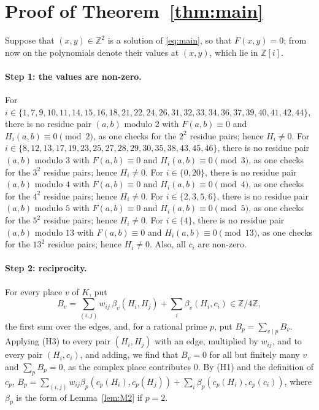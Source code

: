 \documentclass[11pt]{article}
\newcommand{\Z}{\mathbb{Z}}
\begin{document}
\section{Proof of Theorem~\ref{thm:main}}

Suppose that $(x,y)\in\Z^2$ is a solution of \eqref{eq:main}, so that $F(x,y)=0$; from now on the polynomials denote their values at $(x,y)$, which lie in $\Z[i]$.
\paragraph{Step 1: the values are non-zero.} For $i\in\{1,\allowbreak 7,\allowbreak 9,\allowbreak 10,\allowbreak 11,\allowbreak 14,\allowbreak 15,\allowbreak 16,\allowbreak 18,\allowbreak 21,\allowbreak 22,\allowbreak 24,\allowbreak 26,\allowbreak 31,\allowbreak 32,\allowbreak 33,\allowbreak 34,\allowbreak 36,\allowbreak 37,\allowbreak 39,\allowbreak 40,\allowbreak 41,\allowbreak 42,\allowbreak 44\}$, there is no residue pair $(a,b)$ modulo $2$ with $F(a,b)\equiv0$ and $H_i(a,b)\equiv0\pmod{2}$, as one checks for the $2^2$ residue pairs; hence $H_i\neq0$. For $i\in\{8,\allowbreak 12,\allowbreak 13,\allowbreak 17,\allowbreak 19,\allowbreak 23,\allowbreak 25,\allowbreak 27,\allowbreak 28,\allowbreak 29,\allowbreak 30,\allowbreak 35,\allowbreak 38,\allowbreak 43,\allowbreak 45,\allowbreak 46\}$, there is no residue pair $(a,b)$ modulo $3$ with $F(a,b)\equiv0$ and $H_i(a,b)\equiv0\pmod{3}$, as one checks for the $3^2$ residue pairs; hence $H_i\neq0$. For $i\in\{0,\allowbreak 20\}$, there is no residue pair $(a,b)$ modulo $4$ with $F(a,b)\equiv0$ and $H_i(a,b)\equiv0\pmod{4}$, as one checks for the $4^2$ residue pairs; hence $H_i\neq0$. For $i\in\{2,\allowbreak 3,\allowbreak 5,\allowbreak 6\}$, there is no residue pair $(a,b)$ modulo $5$ with $F(a,b)\equiv0$ and $H_i(a,b)\equiv0\pmod{5}$, as one checks for the $5^2$ residue pairs; hence $H_i\neq0$. For $i\in\{4\}$, there is no residue pair $(a,b)$ modulo $13$ with $F(a,b)\equiv0$ and $H_i(a,b)\equiv0\pmod{13}$, as one checks for the $13^2$ residue pairs; hence $H_i\neq0$. Also, all $c_i$ are non-zero.

\paragraph{Step 2: reciprocity.} For every place $v$ of $K$, put
\begin{equation}\label{eq:B}
B_v=\sum_{(i,j)}w_{ij}\,\beta_v(H_i,H_j)+\sum_i\beta_v(H_i,c_i)\in\Z/4\Z,
\end{equation}
the first sum over the edges, and, for a rational prime $p$, put $B_p=\sum_{v\mid p}B_v$. Applying (H3) to every pair $(H_i,H_j)$ with an edge, multiplied by $w_{ij}$, and to every pair $(H_i,c_i)$, and adding, we find that $B_v=0$ for all but finitely many $v$ and $\sum_pB_p=0$, as the complex place contributes $0$. By (H1) and the definition of $c_p$, $B_p=\sum_{(i,j)}w_{ij}\beta_p(c_p(H_i),c_p(H_j))+\sum_i\beta_p(c_p(H_i),c_p(c_i))$, where $\beta_p$ is the form of Lemma~\ref{lem:M2} if $p=2$.
\end{document}
